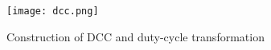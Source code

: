 \begin{figure}
    \centering
    \texttt{[image: dcc.png]} %
    \caption{Construction of DCC and duty-cycle transformation}
    \label{fig:dcc}
\end{figure}
